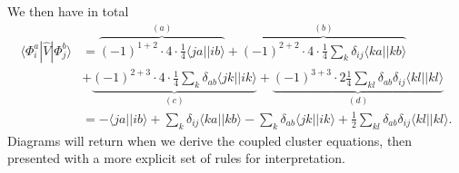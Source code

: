 We then have in total
\begin{equation}
\begin{split}
\langle \Phi_i^a | \hat{V} | \Phi_j^b \rangle
&=
\overbrace{(-1)^{1+2}\cdot 4 \cdot \frac{1}{4} \langle ja || ib \rangle}^{(a)}
+
\overbrace{(-1)^{2+2} \cdot 4 \cdot \frac{1}{4} \sum_k \delta_{ij} \langle ka || kb \rangle}^{(b)} \\
&+
\underbrace{(-1)^{2+3} \cdot 4 \cdot \frac{1}{4} \sum_k \delta_{ab} \langle jk || ik \rangle}_{(c)}
+
\underbrace{(-1)^{3+3} \cdot 2 \frac{1}{4} \sum_{kl} \delta_{ab} \delta_{ij} \langle kl || kl \rangle }_{(d)}\\
&=  - \langle ja || ib \rangle
+  \sum_k \delta_{ij} \langle ka || kb \rangle 
- \sum_k \delta_{ab} \langle jk || ik \rangle
+ \frac{1}{2} \sum_{kl} \delta_{ab} \delta_{ij} \langle kl || kl \rangle  .
\end{split}
\end{equation}
Diagrams will return when we derive the coupled cluster equations, then presented with a more explicit set of rules for interpretation.





